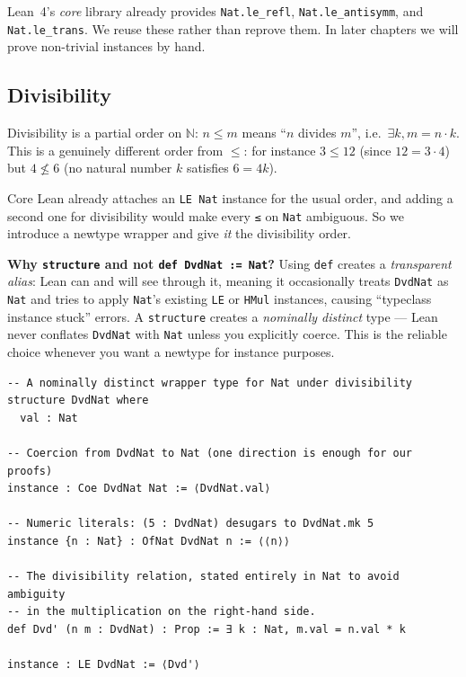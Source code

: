 \documentclass[12pt, a4paper, openright]{book}
\theoremstyle{thmstyle}
\theoremstyle{defstyle}
\newcommand{\lc}[1]{\texttt{#1}}
\newenvironment{notebox}{%
  \begin{tcolorbox}[notebox]%
}{\end{tcolorbox}}
\begin{document}
\begin{notebox}
  Lean~4's \emph{core} library already provides \lc{Nat.le_refl},
  \lc{Nat.le_antisymm}, and \lc{Nat.le_trans}. We reuse these rather than
  reprove them. In later chapters we will prove non-trivial instances by hand.
\end{notebox}

\subsection{Divisibility}

Divisibility is a partial order on $\mathbb{N}$: $n \leq m$ means ``$n$ divides
$m$'', i.e.\ $\exists k, m = n \cdot k$. This is a genuinely different order from
$\leq$: for instance $3 \leq 12$ (since $12 = 3 \cdot 4$) but $4 \not\leq 6$
(no natural number $k$ satisfies $6 = 4k$).

Core Lean already attaches an \lc{LE Nat} instance for the usual order, and
adding a second one for divisibility would make every \lc{≤} on \lc{Nat}
ambiguous. So we introduce a newtype wrapper and give \emph{it} the
divisibility order.

\begin{notebox}
  \textbf{Why \lc{structure} and not \lc{def DvdNat := Nat}?}
  Using \lc{def} creates a \emph{transparent alias}: Lean can and will see
  through it, meaning it occasionally treats \lc{DvdNat} as \lc{Nat} and
  tries to apply \lc{Nat}'s existing \lc{LE} or \lc{HMul} instances, causing
  ``typeclass instance stuck'' errors. A \lc{structure} creates a
  \emph{nominally distinct} type — Lean never conflates \lc{DvdNat} with
  \lc{Nat} unless you explicitly coerce. This is the reliable choice whenever
  you want a newtype for instance purposes.
\end{notebox}

\begin{verbatim}
-- A nominally distinct wrapper type for Nat under divisibility
structure DvdNat where
  val : Nat

-- Coercion from DvdNat to Nat (one direction is enough for our proofs)
instance : Coe DvdNat Nat := ⟨DvdNat.val⟩

-- Numeric literals: (5 : DvdNat) desugars to DvdNat.mk 5
instance {n : Nat} : OfNat DvdNat n := ⟨⟨n⟩⟩

-- The divisibility relation, stated entirely in Nat to avoid ambiguity
-- in the multiplication on the right-hand side.
def Dvd' (n m : DvdNat) : Prop := ∃ k : Nat, m.val = n.val * k

instance : LE DvdNat := ⟨Dvd'⟩
\end{verbatim}
\end{document}
